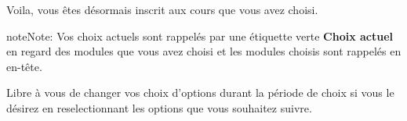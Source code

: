 \documentclass[letterpaper,10pt,french]{sphinxmanual}
\begin{document}
Voila, vous êtes désormais inscrit aux cours que vous avez choisi.

\begin{notice}{note}{Note:}
Vos choix actuels sont rappelés par une étiquette verte \textbf{Choix actuel} en regard des modules que vous avez choisi et les modules choisis sont rappelés en en-tête.
\end{notice}

Libre à vous de changer vos choix d’options durant la période de choix si vous le désirez en reselectionnant les options que vous souhaitez suivre.



\renewcommand{\indexname}{Index}
\printindex
\end{document}
